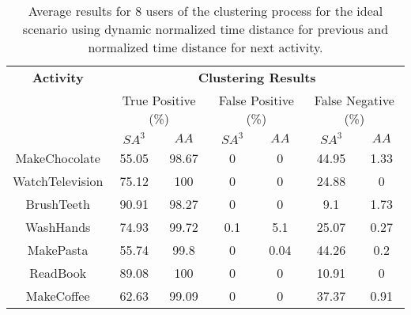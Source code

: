 \begin{table}[htbp]\scriptsize
    \begin{center}    
        \begin{tabular}{ccccccc}
            \hline            
            \textbf{Activity} & \multicolumn{6}{c}{\textbf{Clustering Results}} \\
             & \multicolumn{2}{c}{True Positive (\%)} & \multicolumn{2}{c}{False Positive (\%)} & \multicolumn{2}{c}{False Negative (\%)} \\
             & $SA^3$ & $AA$ & $SA^3$ & $AA$ & $SA^3$ & $AA$ \\
            \hline
            MakeChocolate   & 55.05 & 98.67 & 0    & 0    & 44.95 & 1.33 \\
	    WatchTelevision & 75.12 & 100   & 0    & 0    & 24.88 & 0    \\
	    BrushTeeth      & 90.91 & 98.27 & 0    & 0    & 9.1   & 1.73 \\
	    WashHands       & 74.93 & 99.72 & 0.1  & 5.1  & 25.07 & 0.27 \\
	    MakePasta       & 55.74 & 99.8  & 0    & 0.04 & 44.26 & 0.2 \\
	    ReadBook        & 89.08 & 100   & 0    & 0    & 10.91 & 0 \\
	    MakeCoffee      & 62.63 & 99.09 & 0    & 0    & 37.37 & 0.91 \\
            \hline
        \end{tabular}
        \caption{Average results for 8 users of the clustering process for the ideal scenario using dynamic normalized time distance for previous and normalized time distance for next activity.}
        \label{tab-r-ideal-t2}
    \end{center}
\end{table}
        
